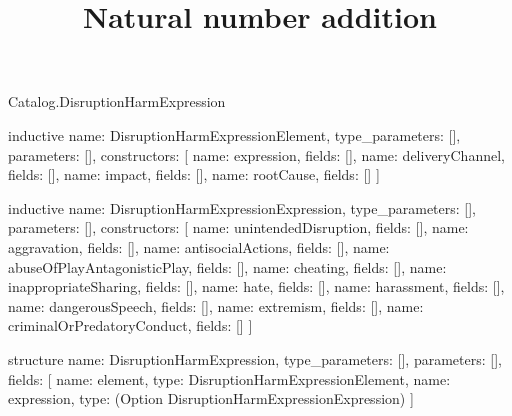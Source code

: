 \begin{lexlean}{Catalog.DisruptionHarmExpression}
\title{Natural number addition}
\begin{semanticmodule}
inductive{
  name: DisruptionHarmExpressionElement,
  type_parameters: [],
  parameters: [],
  constructors: [
    {name: expression, fields: []},
    {name: deliveryChannel, fields: []},
    {name: impact, fields: []},
    {name: rootCause, fields: []}
  ]
}

inductive{
  name: DisruptionHarmExpressionExpression,
  type_parameters: [],
  parameters: [],
  constructors: [
    {name: unintendedDisruption, fields: []},
    {name: aggravation, fields: []},
    {name: antisocialActions, fields: []},
    {name: abuseOfPlayAntagonisticPlay, fields: []},
    {name: cheating, fields: []},
    {name: inappropriateSharing, fields: []},
    {name: hate, fields: []},
    {name: harassment, fields: []},
    {name: dangerousSpeech, fields: []},
    {name: extremism, fields: []},
    {name: criminalOrPredatoryConduct, fields: []}
  ]
}

structure{
  name: DisruptionHarmExpression,
  type_parameters: [],
  parameters: [],
  fields: [
    {name: element, type: DisruptionHarmExpressionElement},
    {name: expression, type: (Option DisruptionHarmExpressionExpression)}
  ]
}
\end{semanticmodule}
\end{lexlean}
